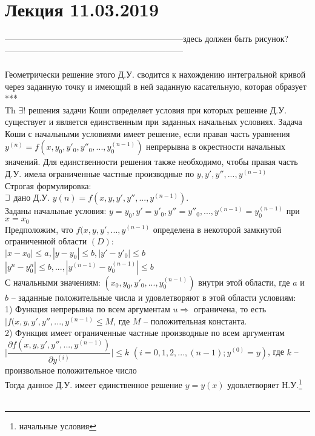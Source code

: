 \documentclass{article}
\numberwithin{equation}{section}
\def\letus{%
    \mathord{\setbox0=\hbox{$\exists$}%
             \hbox{\kern 0.125\wd0%
                   \vbox to \ht0{%
                      \hrule width 0.75\wd0%
                      \vfill%
                      \hrule width 0.75\wd0}%
                   \vrule height \ht0%
                   \kern 0.125\wd0}%
           }%
}
\begin{document}
\section{Лекция 11.03.2019}
---------------------------------------------------------------\colorbox{red!50}{здесь должен быть рисунок?}---------------------------------------------------------------
\\\\
Геометрически решение этого Д.У. сводится к нахождению интегральной кривой через заданную точку и имеющий в ней заданную касательную, которая образует \colorbox{red!50}{***}\\
Th $\exists!$ решения задачи Коши определяет условия при которых решение Д.У. существует и является единственным при заданных начальных условиях. Задача Коши с начальными условиями имеет решение, если правая часть уравнения $y^{(n)}=f(x,y_0,y'_0,y''_0,...,y_0^{(n-1)})$ непрерывна в окрестности начальных значений. Для единственности решения также необходимо, чтобы правая часть Д.У. имела ограниченные частные производные по $y,y',y'',...,y^{(n-1)}$\\
Строгая формулировка:\\
$\letus$ дано Д.У. $y(n)=f(x,y,y',y'',...,y^{(n-1)})$.\\
Заданы начальные условия: $y=y_0,y'=y'_0,y''=y''_0,...,y^{(n-1)}=y_0^{(n-1)}$ при $x=x_0$\\
Предположим, что $f(x,y,y',...,y^{(n-1)}$ определена в некоторой замкнутой ограниченной области $(D)$:\\
$|x-x_0|\leqslant a, |y-y_0|\leqslant b, |y'-y'_0|\leqslant b$\\
$|y^n-y^n_0|\leqslant b,...,|y^{(n-1)}-y_0^{(n-1)}|\leqslant b$\\
С начальными значениям: $(x_0,y_0,y'_0,...,y_0^{(n-1)})$ внутри этой области, где $a$ и $b$ -- заданные положительные числа и удовлетворяют в этой области условиям:\\
1) Функция непрерывна по всем аргументам $u\Rightarrow$ ограничена, то есть $|f(x,y,y',y'',...,y^{(n-1)}\leqslant M$, где $M$ -- положительная константа.\\
2) Функция имеет ограниченные частные производные по всем аргументам $\bigg|\dfrac{\partial f(x,y,y',y'',...,y^{(n-1)})}{\partial y^{(i)}}\bigg|\leqslant k$ $(i=0,1,2,...,(n-1); y^{(0)}=y)$, где $k$ -- произвольное положительное число\\
Тогда данное Д.У. имеет единственное решение $y=y(x)$ удовлетворяет Н.У.\footnote{начальные условия}
\\\\
\end{document}
